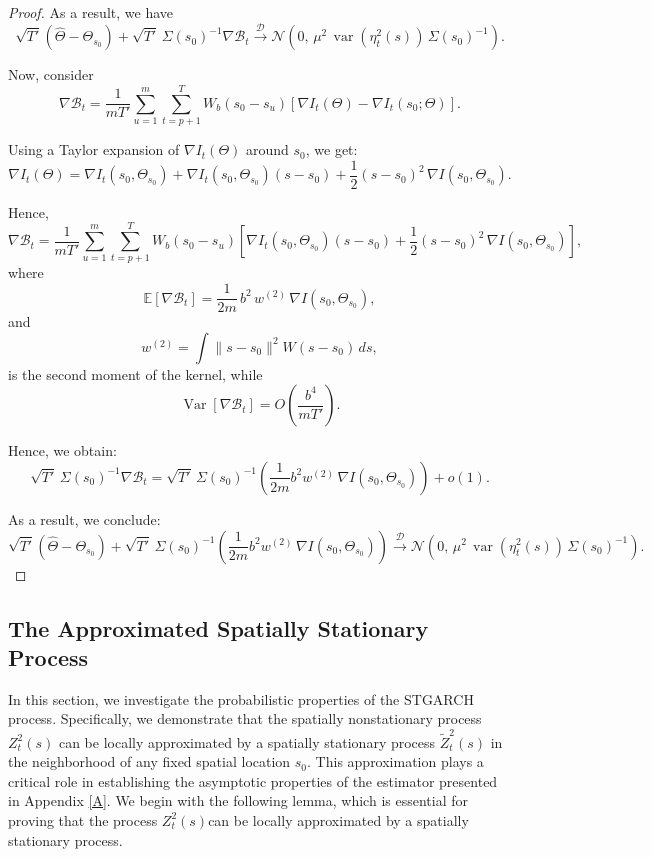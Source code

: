 \documentclass[fleqn,11pt]{article}
\begin{document}
\begin{proof}
As a result, we have
$$
\sqrt{T'}\left(\hat{\Theta} - \Theta_{s_0}\right)
+
\sqrt{T'}\, \Sigma(s_0)^{-1} \nabla \mathscr{B}_t
\xrightarrow{\mathcal{D}}
\mathcal{N}\left(0,\, \mu^2\, \operatorname{var}\left(\eta_t^2(s)\right)\, \Sigma(s_0)^{-1}\right).
$$

Now, consider
$$
\nabla \mathscr{B}_t
=
\frac{1}{m T'} \sum_{u=1}^m \sum_{t=p+1}^T W_b(s_0 - s_u)
\left[
\nabla I_t(\Theta) - \nabla I_t(s_0; \Theta)
\right].
$$

Using a Taylor expansion of $\nabla I_t(\Theta)$ around $s_0$, we get:
$$
\nabla I_t\left(\Theta\right)
=
\nabla I_t\left(s_0, \Theta_{s_0}\right)
+
\nabla I_t\left(s_0, \Theta_{s_0}\right)(s - s_0)
+
\frac{1}{2}(s - s_0)^2\, \nabla I\left(s_0, \Theta_{s_0}\right).
$$

Hence,
$$
\nabla \mathscr{B}_t
=
\frac{1}{m T'} \sum_{u=1}^m \sum_{t=p+1}^T W_b(s_0 - s_u)
\left[
\nabla I_t\left(s_0, \Theta_{s_0}\right)(s - s_0)
+
\frac{1}{2}(s - s_0)^2\, \nabla I\left(s_0, \Theta_{s_0}\right)
\right],
$$
where
$$
\mathbb{E}[\nabla \mathscr{B}_t]
=
\frac{1}{2m}\, b^2\, w^{(2)}\, \nabla I\left(s_0, \Theta_{s_0}\right),
$$
and
$$
w^{(2)} = \int \|s - s_0\|^2 W(s - s_0)\, ds,
$$
is the second moment of the kernel, while
$$
\operatorname{Var}[\nabla \mathscr{B}_t]
= O\left( \frac{b^4}{m T'} \right).
$$

Hence, we obtain:
$$
\sqrt{T'}\, \Sigma(s_0)^{-1} \nabla \mathscr{B}_t
=
\sqrt{T'}\, \Sigma(s_0)^{-1} \left(\frac{1}{2m} b^2 w^{(2)}\, \nabla I\left(s_0, \Theta_{s_0}\right)\right)
+ o(1).
$$

As a result, we conclude:
$$
\sqrt{T'}\left(\hat{\Theta} - \Theta_{s_0}\right)
+
\sqrt{T'}\, \Sigma(s_0)^{-1} \left( \frac{1}{2m} b^2 w^{(2)}\, \nabla I\left(s_0, \Theta_{s_0}\right) \right)
\xrightarrow{\mathcal{D}}
\mathcal{N}\left(0,\, \mu^2\, \operatorname{var}\left(\eta_t^2(s)\right)\, \Sigma(s_0)^{-1}\right).
$$
\end{proof}

\subsection{ The Approximated Spatially Stationary Process}\label{B}

In this section, we investigate the probabilistic properties of the STGARCH process. Specifically, we demonstrate that the spatially nonstationary process $ Z_t^2(s) $ can be locally approximated by a spatially stationary process $\widetilde{Z}^2_{t}(s) $ in the neighborhood of any fixed spatial location $ s_0 $.
This approximation plays a critical role in establishing the asymptotic properties of the estimator presented in Appendix \ref{A}.
We begin with the following lemma, which is essential for proving that the process $Z^2_t(s)$can be locally approximated by a spatially stationary process.\\
\end{document}
